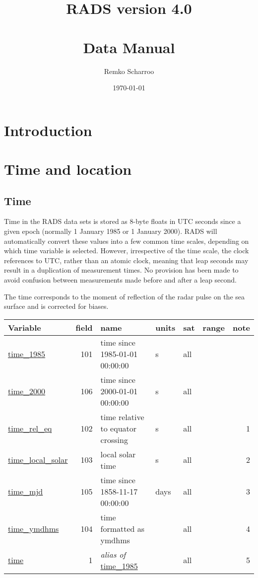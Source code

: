 \documentclass[a4paper,11pt,openany,natbib]{thesis}
\title{RADS version 4.0 \\ ~ \\
Data Manual}
\author{Remko Scharroo}
\date{\today}
\makeatletter
\newcommand\var[1]{\url{#1}\index{variables!#1@\protect\url{#1}}}
\newcommand\alias[1]{\emph{alias of} \var{#1}}
\newenvironment{vartable}{
\begin{table}[ht]
\small
\begin{tabular}{lrllllr}
\hline
Variable & field & name & units & sat & range & note \\
\hline
}{
\hline
\end{tabular}
\end{table}
}
\makeatother
\begin{document}
\makeatletter
\renewcommand{\tiny}{\@setfontsize\tiny{5.8pt}{6.5}}
\makeatother

\maketitle
\tableofcontents

\chapter{Introduction}
\label{ch:intro}

\chapter{Time and location}
\label{ch:time and location}

\section{Time}
Time in the RADS data sets is stored as 8-byte floats in UTC seconds since a given epoch (normally 1 January 1985 or 1 January 2000). RADS will automatically convert these values into a few common time scales, depending on which time variable is selected.
However, irrespective of the time scale, the clock references to UTC, rather than an atomic clock, meaning that leap seconds may result in a duplication of measurement times. No provision has been made to avoid confusion between measurements made before and after a leap second.

The time corresponds to the moment of reflection of the radar pulse on the sea surface and is corrected for biases.

\begin{vartable}
\var{time_1985} & 101 & time since 1985-01-01 00:00:00 & s & all & & \\
\var{time_2000} & 106 & time since 2000-01-01 00:00:00 & s & all & & \\
\var{time_rel_eq} & 102 & time relative to equator crossing & s & all & & 1 \\
\var{time_local_solar} & 103 & local solar time & s & all & & 2 \\
\var{time_mjd} & 105 & time since 1858-11-17 00:00:00 & days & all & & 3 \\
\var{time_ymdhms} & 104 & time formatted as ymdhms &  & all & & 4 \\
\hline
\var{time} & 1 & \alias{time_1985} & & all & & 5 \\
\end{vartable}
\end{document}
